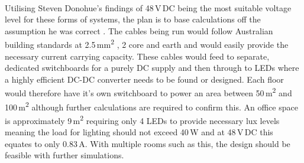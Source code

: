 \paragraph{}
Utilising Steven Donohue's findings of 48\,V\,DC being the most suitable voltage level for these forms  of systems, the plan is to base calculations off the assumption he was correct \cite{Donohue2014}. The cables being run would follow Australian building standards at 2.5\,\si{mm^2} , 2 core and earth and would easily provide the necessary current carrying capacity. These cables would feed to separate, dedicated switchboards for a purely DC supply and then through to LEDs where a highly efficient DC-DC converter needs to be found or designed. Each floor would therefore have it's own switchboard to power an area between 50\,\si{m^2} and 100\,\si{m^2} although further calculations are required to confirm this. An office space is approximately 9\,\si{m^2} requiring only 4 LEDs to provide necessary lux levels meaning the load for lighting should not exceed 40\,W and at 48\,V\,DC this equates to only 0.83\,A. With multiple rooms such as this, the design should be feasible with further simulations.  

\newpage